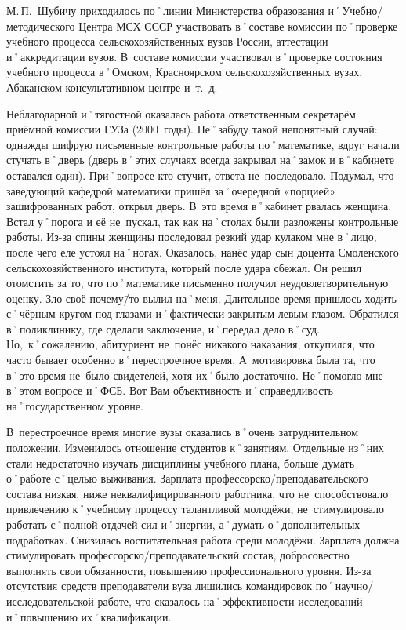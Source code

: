 М.\,П.~Шубичу приходилось по˚линии Министерства образования и˚Учебно\-/методического Центра МСХ СССР участвовать в˚составе комиссии по˚проверке учебного процесса сельскохозяйственных вузов России, аттестации и˚аккредитации вузов. В~составе комиссии участвовал в˚проверке состояния учебного процесса в˚Омском, Красноярском сельскохозяйственных вузах, Абаканском консультативном центре и~т.~д.

Неблагодарной и˚тягостной оказалась работа ответственным секретарём приёмной комиссии ГУЗа (2000~годы). Не˚забуду такой непонятный случай: однажды шифрую письменные контрольные работы по˚математике, вдруг начали стучать в˚дверь (дверь в˚этих случаях всегда закрывал на˚замок и в˚кабинете оставался один). При˚вопросе кто стучит, ответа не~последовало. Подумал, что заведующий кафедрой математики пришёл за˚очередной «порцией» зашифрованных работ, открыл дверь. В~это время в˚кабинет рвалась женщина. Встал у˚порога и её не~пускал, так как на˚столах были разложены контрольные работы. Из-за спины женщины последовал резкий удар кулаком мне в˚лицо, после чего еле устоял на˚ногах. Оказалось, нанёс удар сын доцента Смоленского сельскохозяйственного института, который после удара сбежал. Он решил отомстить за то, что по˚математике письменно получил неудовлетворительную оценку. Зло своё почему\=/то вылил на˚меня. Длительное время пришлось ходить с˚чёрным кругом под глазами и˚фактически закрытым левым глазом. Обратился в˚поликлинику, где сделали заключение, и˚передал дело в˚суд. Но,~к˚сожалению, абитуриент не~понёс никакого наказания, откупился, что часто бывает особенно в˚перестроечное время. А~мотивировка была та, что в˚это время не~было свидетелей, хотя их˚было достаточно. Не˚помогло мне в˚этом вопросе и˚ФСБ. Вот Вам объективность и˚справедливость на˚государственном уровне.

В~перестроечное время многие вузы оказались в˚очень затруднительном положении. Изменилось отношение студентов к˚занятиям. Отдельные из˚них стали недостаточно изучать дисциплины учебного плана, больше думать о˚работе с˚целью выживания. Зарплата профессорско\-/преподавательского состава низкая, ниже неквалифицированного работника, что не~способствовало привлечению к˚учебному процессу талантливой молодёжи, не~стимулировало работать с˚полной отдачей сил и˚энергии, а˚думать о˚дополнительных подработках. Снизилась воспитательная работа среди молодёжи. Зарплата должна стимулировать профессорско\-/преподавательский состав, добросовестно выполнять свои обязанности, повышению профессионального уровня. Из-за отсутствия средств преподаватели вуза лишились командировок по˚научно\-/исследовательской работе, что сказалось на˚эффективности исследований и˚повышению их˚квалификации. 

